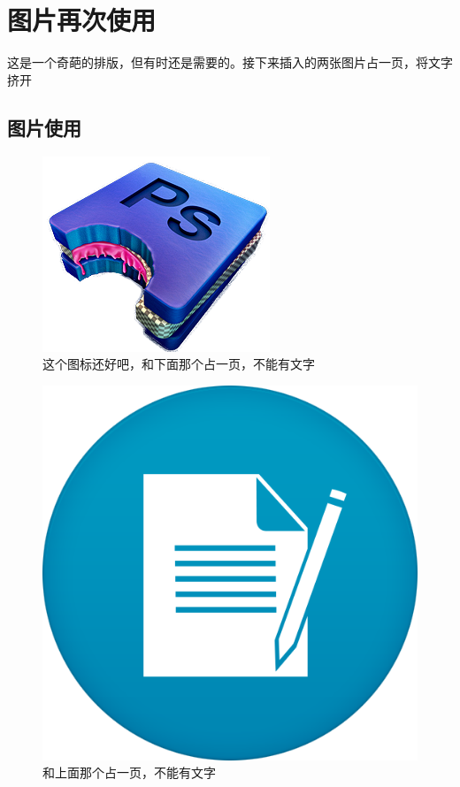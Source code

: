 \chapter{图片再次使用}
这是一个奇葩的排版，但有时还是需要的。接下来插入的两张图片占一页，将文字挤开
\section{图片使用}
\begin{figure}[p]
	\centering
	\includegraphics[scale=0.5]{./images/1.png}
	\caption{这个图标还好吧，和下面那个占一页，不能有文字}
	\label{fig:3-1}
\end{figure}
\begin{figure}[p]
	\centering
	\includegraphics[scale=0.5]{./images/2.png}
	\caption{和上面那个占一页，不能有文字}
	\label{fig:3-1}
\end{figure}
